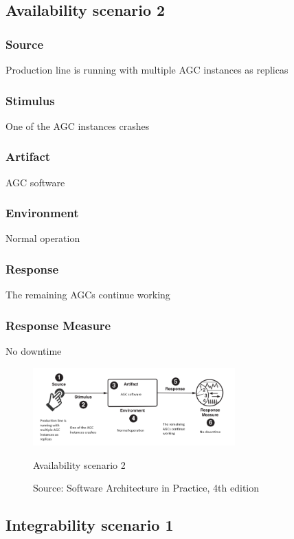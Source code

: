 \subsection{Availability scenario 2}

\subsubsection{Source}
Production line is running with multiple AGC instances as replicas

\subsubsection{Stimulus}
One of the AGC instances crashes

\subsubsection{Artifact}
AGC software

\subsubsection{Environment}
Normal operation

\subsubsection{Response}
The remaining AGCs continue working

\subsubsection{Response Measure}
No downtime

\begin{figure}[h]
\centering
  \includegraphics[height=3cm]{images/qa_scenario_agc_downtime.png}
  \caption{Availability scenario 2}
  \caption*{Source: Software Architecture in Practice, 4th edition \cite{bass2021software}}
  \label{fig:qa_availability_scenario_2}
\end{figure}

\subsection{Integrability scenario 1}

